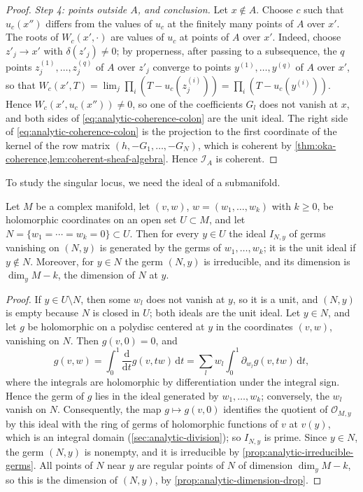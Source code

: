 \begin{proof}
\emph{Step 4: points outside $A$, and conclusion.} Let $x\notin A$. Choose $c$ such that $u_c(x'')$ differs from the values of $u_c$ at the finitely many points of $A$ over $x'$. The roots of $W_c(x',\cdot)$ are values of $u_c$ at points of $A$ over $x'$. Indeed, choose $z'_j\to x'$ with $\delta(z'_j)\neq0$; by properness, after passing to a subsequence, the $q$ points $z^{(1)}_j,\ldots,z^{(q)}_j$ of $A$ over $z'_j$ converge to points $y^{(1)},\ldots,y^{(q)}$ of $A$ over $x'$, so that $W_c(x',T)=\lim_j\prod_i(T-u_c(z^{(i)}_j))=\prod_i(T-u_c(y^{(i)}))$. Hence $W_c(x',u_c(x''))\neq0$, so one of the coefficients $G_l$ does not vanish at $x$, and both sides of \eqref{eq:analytic-coherence-colon} are the unit ideal. The right side of \eqref{eq:analytic-coherence-colon} is the projection to the first coordinate of the kernel of the row matrix $(h,-G_1,\ldots,-G_N)$, which is coherent by \cref{thm:oka-coherence,lem:coherent-sheaf-algebra}. Hence $\mathcal I_A$ is coherent.
\end{proof}

To study the singular locus, we need the ideal of a submanifold.

\begin{lemma}\label{lem:submanifold-ideal}
Let $M$ be a complex manifold, let $(v,w)$, $w=(w_1,\ldots,w_k)$ with $k\geq0$, be holomorphic coordinates on an open set $U\subset M$, and let $N=\{w_1=\cdots=w_k=0\}\subset U$. Then for every $y\in U$ the ideal $I_{N,y}$ of germs vanishing on $(N,y)$ is generated by the germs of $w_1,\ldots,w_k$; it is the unit ideal if $y\notin N$. Moreover, for $y\in N$ the germ $(N,y)$ is irreducible, and its dimension is $\dim_yM-k$, the dimension of $N$ at $y$.
\end{lemma}
\begin{proof}
If $y\in U\setminus N$, then some $w_l$ does not vanish at $y$, so it is a unit, and $(N,y)$ is empty because $N$ is closed in $U$; both ideals are the unit ideal. Let $y\in N$, and let $g$ be holomorphic on a polydisc centered at $y$ in the coordinates $(v,w)$, vanishing on $N$. Then $g(v,0)=0$, and
\[
 g(v,w)=\int_0^1\frac{\mathrm d}{\mathrm dt}g(v,tw)\,\mathrm dt=\sum_lw_l\int_0^1\partial_{w_l}g(v,tw)\,\mathrm dt,
\]
where the integrals are holomorphic by differentiation under the integral sign. Hence the germ of $g$ lies in the ideal generated by $w_1,\ldots,w_k$; conversely, the $w_l$ vanish on $N$. Consequently, the map $g\mapsto g(v,0)$ identifies the quotient of $\mathcal O_{M,y}$ by this ideal with the ring of germs of holomorphic functions of $v$ at $v(y)$, which is an integral domain (\cref{sec:analytic-division}); so $I_{N,y}$ is prime. Since $y\in N$, the germ $(N,y)$ is nonempty, and it is irreducible by \cref{prop:analytic-irreducible-germs}. All points of $N$ near $y$ are regular points of $N$ of dimension $\dim_yM-k$, so this is the dimension of $(N,y)$, by \cref{prop:analytic-dimension-drop}.
\end{proof}

